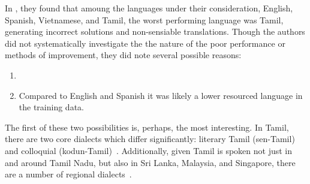 In \citet{jordan2024need}, they found that amoung the languages under their
consideration, English, Spanish, Vietnamese, and Tamil, the worst performing
language was Tamil, generating incorrect solutions and non-sensiable
translations. Though the authors did not systematically investigate the the
nature of the poor performance or methods of improvement, they did note several
possible reasons:
\begin{enumerate}
  \item 
  \item Compared to English and Spanish it was likely a lower resourced language
    in the training data.
\end{enumerate}
The first of these two possibilities is, perhaps, the most interesting. In
Tamil, there are two core dialects which differ significantly: literary Tamil
(sen-Tamil) and colloquial (kodun-Tamil)~\cite{}. Additionally, given Tamil is
spoken not just in and around Tamil Nadu, but also in Sri Lanka, Malaysia, and
Singapore, there are a number of regional dialects~\cite{}. 
